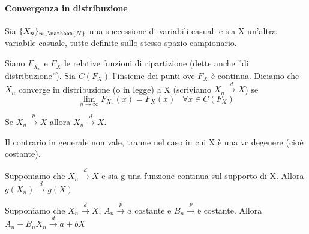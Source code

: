\paragraph{Convergenza in distribuzione}
\begin{definizione}

Sia $\{X_n\}_{n\in\mathbbm{N}}$ una successione di variabili casuali e 
sia X un'altra variabile casuale, tutte definite sullo stesso spazio campionario.

Siano $F_{X_n}$ e $F_X$ le relative funzioni di ripartizione (dette anche ''di distribuzione'').
Sia $C(F_X)$ l'insieme dei punti ove $F_X$ è continua. 
Diciamo che $X_n$ converge in distribuzione (o in legge) a X (scriviamo $X_n\stackrel{d}{\rightarrow}X$) se 
$$\lim_{n \rightarrow\infty} F_{X_n}(x)=F_X(x) \; \; \; \forall x \in C(F_X)$$
\end{definizione}

\begin{teo}
Se $X_n\stackrel{p}{\rightarrow}X$ allora $X_n\stackrel{d}{\rightarrow}X$.
\end{teo}
\begin{oss}
Il contrario in generale non vale, tranne nel caso in cui X è una vc degenere (cioè costante).
\end{oss}
\begin{teo} Supponiamo che $X_n\stackrel{d}{\rightarrow}X$ e sia g una funzione continua sul supporto di X. Allora $g(X_n)\stackrel{d}{\rightarrow}g(X)$
\end{teo}
\begin{teo} [Slutsky] Supponiamo che $X_n\stackrel{d}{\rightarrow}X$, $A_n\stackrel{p}{\rightarrow}a$ costante e $B_n\stackrel{p}{\rightarrow}b$ costante. Allora $A_n+B_n X_n\stackrel{d}{\rightarrow}a+bX$
\end{teo}
